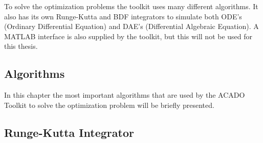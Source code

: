 To solve the optimization problems the toolkit uses many different algorithms. It also has its own Runge-Kutta and BDF integrators to simulate both ODE's (Ordinary Differential Equation) and DAE's (Differential Algebraic Equation). A MATLAB interface is also supplied by the toolkit, but this will not be used for this thesis.


\subsection{Algorithms}

In this chapter the most important algorithms that are used by the ACADO Toolkit to solve the optimization problem will be briefly presented.


\subsection{Runge-Kutta Integrator}
